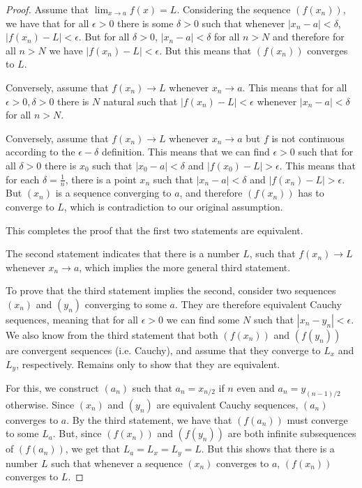 \begin{proof}
Assume that  $\lim_{x\rightarrow a} f(x) = L$. Considering the sequence $(f(x_n))$, we have that for all $\epsilon > 0$ there is some $\delta>0$ such that whenever $|x_n-a|<\delta$, $|f(x_n)-L|<\epsilon$. But for all $\delta>0$, $|x_n-a|<\delta$ for all $n>N$ and therefore for all $n>N$ we have $|f(x_n)-L|<\epsilon$. But this means that $(f(x_n))$ converges to $L$.

Conversely, assume that $f(x_n) \rightarrow L$ whenever $x_n \rightarrow a$. This means that for all $\epsilon>0, \delta>0$ there is $N$ natural such that $|f(x_n) - L| < \epsilon$ whenever $|x_n - a| < \delta$ for all $n>N$. 

Conversely, assume that $f(x_n) \rightarrow L$ whenever $x_n \rightarrow a$ but $f$ is not continuous according to the $\epsilon-\delta$ definition. This means that we can find $\epsilon > 0$ such that for all $\delta>0$ there is $x_0$ such that $|x_0-a| < \delta$ and $|f(x_0) - L| > \epsilon$. This means that for each $\delta = \frac{1}{n}$, there is a point $x_n$ such that $|x_n-a| < \delta$ and $|f(x_n) - L| > \epsilon$. But $(x_n)$ is a sequence converging to $a$, and therefore $(f(x_n))$ has to converge to $L$, which is contradiction to our original assumption.


This completes the proof that the first two statements are equivalent.


The second statement indicates that there is a number $L$, such that $f(x_n) \rightarrow L$ whenever $x_n \rightarrow a$, which implies the more general third statement. 

To prove that the third statement implies the second, consider two sequences $(x_n)$ and $(y_n)$ converging to some $a$. They are therefore equivalent Cauchy sequences, meaning that for all $\epsilon > 0$ we can find some $N$ such that $|x_n - y_n| < \epsilon$. We also know from the third statement that both $(f(x_n))$ and $(f(y_n))$ are convergent sequences (i.e. Cauchy), and assume that they converge to $L_x$ and $L_y$, respectively. Remains only to show that they are equivalent.

For this, we construct $(a_n)$ such that $a_n = x_{n/2}$ if $n$ even and $a_n = y_{(n-1)/2}$ otherwise. Since $(x_n)$ and $(y_n)$ are equivalent Cauchy sequences, $(a_n)$ converges to $a$. By the third statement, we have that $(f(a_n))$ must converge to some $L_a$. But, since $(f(x_n))$ and $(f(y_n))$ are both infinite subsequences of $(f(a_n))$, we get that $L_a = L_x = L_y = L$. But this shows that there is a number $L$ such that whenever a sequence $(x_n)$ converges to $a$, $(f(x_n))$ converges to $L$.



\end{proof}

